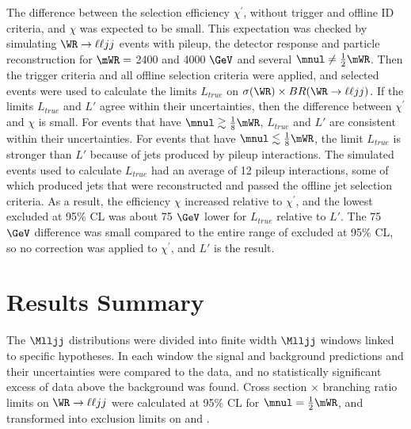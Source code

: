 The difference between the selection efficiency $\chi^'$, without trigger and offline ID criteria, and $\chi$ was expected to be small.  
This expectation was checked by simulating $\WR \rightarrow \ell\ell jj$ events with pileup, the detector response and particle 
reconstruction for $\mWR =$ 2400 and 4000 $\GeV$ and several $\mnul \neq \frac{1}{2}\mWR$.  Then the trigger criteria and all offline selection 
criteria were applied, and selected events were used to calculate the limits $L_{true}$ on $\sigma(\WR) \times BR(\WR \rightarrow \ell\ell jj)$.  
If the limits $L_{true}$ and $L'$ agree within their uncertainties, then the difference between $\chi^'$ and $\chi$ is small.  For events that 
have $\mnul \gtrsim \frac{1}{8}\mWR$, $L_{true}$ and $L'$ are consistent within their uncertainties.  For events that have 
$\mnul \lesssim \frac{1}{8}\mWR$, the limit $L_{true}$ is stronger than $L'$ because of jets produced by pileup interactions.  The simulated 
events used to calculate $L_{true}$ had an average of 12 pileup interactions, some of which produced jets that were reconstructed and passed 
the offline jet selection criteria.  As a result, the efficiency $\chi$ increased relative to $\chi^'$, and the lowest \mnul excluded 
at 95\% CL was about 75 $\GeV$ lower for $L_{true}$ relative to $L'$.  The 75 $\GeV$ difference was small compared to the entire range of 
\mnul excluded at 95\% CL, so no correction was applied to $\chi^'$, and $L'$ is the result.


\section{Results Summary}
The $\Mlljj$ distributions were divided into finite width $\Mlljj$ windows linked to specific \mWR hypotheses.  In each window the 
signal and background predictions and their uncertainties were compared to the data, and no statistically significant excess of 
data above the background was found.  Cross section $\times$ branching ratio limits on $\WR \rightarrow \ell\ell jj$ were calculated 
at 95\% CL for $\mnul = \frac{1}{2}\mWR$, and transformed into exclusion limits on \mWR and \mnul.


